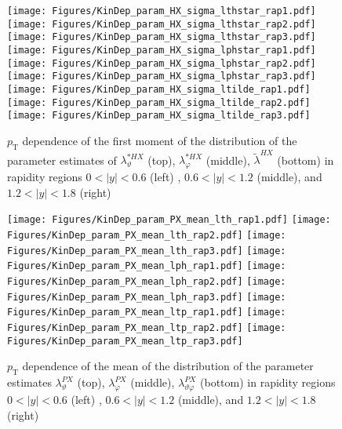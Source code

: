 \documentclass[12pt]{article}
\newcommand{\pT}{p_\mathrm{T}}
\newcommand{\absy}{\left |  y \right |}
\newcommand{\lamtildeHX}{\tilde{\lambda}^{\scriptscriptstyle HX}}
\newcommand{\lamthstarHX}{\lambda^{* \scriptscriptstyle HX}_\vartheta}
\newcommand{\lamphstarHX}{\lambda^{* \scriptscriptstyle HX}_\varphi}
\newcommand{\lamthPX}{\lambda^{\scriptscriptstyle PX}_\vartheta}
\newcommand{\lamphPX}{\lambda^{\scriptscriptstyle PX}_\varphi}
\newcommand{\lamthphPX}{\lambda^{\scriptscriptstyle PX}_{\vartheta \varphi}}
\begin{document}
\begin{figure}[htbp]
\centering
\texttt{[image: Figures/KinDep\_param\_HX\_sigma\_lthstar\_rap1.pdf]}
\texttt{[image: Figures/KinDep\_param\_HX\_sigma\_lthstar\_rap2.pdf]}
\texttt{[image: Figures/KinDep\_param\_HX\_sigma\_lthstar\_rap3.pdf]}
\texttt{[image: Figures/KinDep\_param\_HX\_sigma\_lphstar\_rap1.pdf]}
\texttt{[image: Figures/KinDep\_param\_HX\_sigma\_lphstar\_rap2.pdf]}
\texttt{[image: Figures/KinDep\_param\_HX\_sigma\_lphstar\_rap3.pdf]}
\texttt{[image: Figures/KinDep\_param\_HX\_sigma\_ltilde\_rap1.pdf]}
\texttt{[image: Figures/KinDep\_param\_HX\_sigma\_ltilde\_rap2.pdf]}
\texttt{[image: Figures/KinDep\_param\_HX\_sigma\_ltilde\_rap3.pdf]}
\caption{$\pT$ dependence of the first moment of the distribution of the parameter estimates of $\lamthstarHX$ (top), $\lamphstarHX$ (middle), $\lamtildeHX$ (bottom) in rapidity regions $0<\absy<0.6$ (left) , $0.6<\absy<1.2$ (middle), and $1.2<\absy<1.8$ (right)}
\end{figure}
\clearpage








\begin{figure}[htbp]
\centering
\texttt{[image: Figures/KinDep\_param\_PX\_mean\_lth\_rap1.pdf]}
\texttt{[image: Figures/KinDep\_param\_PX\_mean\_lth\_rap2.pdf]}
\texttt{[image: Figures/KinDep\_param\_PX\_mean\_lth\_rap3.pdf]}
\texttt{[image: Figures/KinDep\_param\_PX\_mean\_lph\_rap1.pdf]}
\texttt{[image: Figures/KinDep\_param\_PX\_mean\_lph\_rap2.pdf]}
\texttt{[image: Figures/KinDep\_param\_PX\_mean\_lph\_rap3.pdf]}
\texttt{[image: Figures/KinDep\_param\_PX\_mean\_ltp\_rap1.pdf]}
\texttt{[image: Figures/KinDep\_param\_PX\_mean\_ltp\_rap2.pdf]}
\texttt{[image: Figures/KinDep\_param\_PX\_mean\_ltp\_rap3.pdf]}
\caption{$\pT$ dependence of the mean of the distribution of the parameter estimates $\lamthPX$ (top), $\lamphPX$ (middle), $\lamthphPX$ (bottom) in rapidity regions $0<\absy<0.6$ (left) , $0.6<\absy<1.2$ (middle), and $1.2<\absy<1.8$ (right)}
\end{figure}
\clearpage
\end{document}
